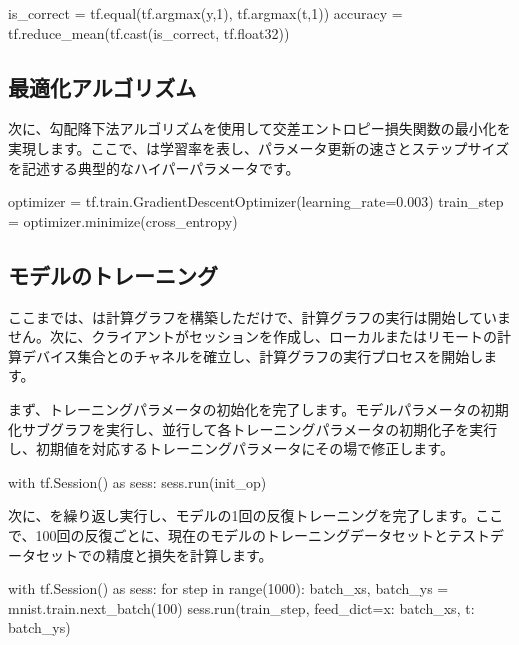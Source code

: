 \begin{content}
\begin{leftbar}
\begin{python}
is_correct = tf.equal(tf.argmax(y,1), tf.argmax(t,1))
accuracy = tf.reduce_mean(tf.cast(is_correct, tf.float32))
\end{python}
\end{leftbar}

\subsection{最適化アルゴリズム}

次に、勾配降下法アルゴリズムを使用して交差エントロピー損失関数の最小化を実現します。ここで、は学習率を表し、パラメータ更新の速さとステップサイズを記述する典型的なハイパーパラメータです。

\begin{leftbar}
\begin{python}
optimizer = tf.train.GradientDescentOptimizer(learning_rate=0.003)
train_step = optimizer.minimize(cross_entropy)
\end{python}
\end{leftbar}

\subsection{モデルのトレーニング}

ここまでは、\tf{}は計算グラフを構築しただけで、計算グラフの実行は開始していません。次に、クライアントがセッションを作成し、ローカルまたはリモートの計算デバイス集合とのチャネルを確立し、計算グラフの実行プロセスを開始します。

まず、トレーニングパラメータの初始化を完了します。モデルパラメータの初期化サブグラフを実行し、並行して各トレーニングパラメータの初期化子を実行し、初期値を対応するトレーニングパラメータにその場で修正します。

\begin{leftbar}
\begin{python}
with tf.Session() as sess:
  sess.run(init_op)
\end{python}
\end{leftbar}

次に、を繰り返し実行し、モデルの1回の反復トレーニングを完了します。ここで、100回の反復ごとに、現在のモデルのトレーニングデータセットとテストデータセットでの精度と損失を計算します。

\begin{leftbar}
\begin{python}
with tf.Session() as sess:
  for step in range(1000):
    batch_xs, batch_ys = mnist.train.next_batch(100)        
    sess.run(train_step, feed_dict={x: batch_xs, t: batch_ys})
    

\end{python}
\end{leftbar}
\end{content}
